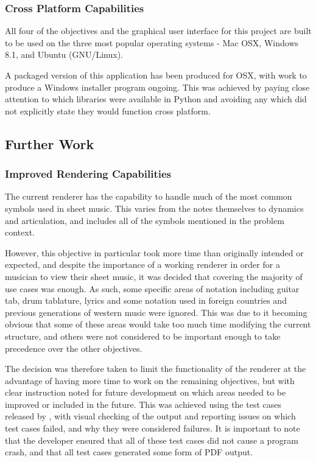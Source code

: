 \subsubsection{Cross Platform Capabilities}
All four of the objectives and the graphical user interface for this project are built to be used on the three most popular operating systems - Mac OSX, Windows 8.1, and Ubuntu (GNU/Linux).

A packaged version of this application has been produced for OSX, with work to produce a Windows installer program ongoing. This was achieved by paying close attention to which libraries were available in Python and avoiding any which did not explicitly state they would function cross platform.


\subsection{Further Work}
\subsubsection{Improved Rendering Capabilities}
The current renderer has the capability to handle much of the most common symbols used in sheet music. This varies from the notes themselves to dynamics and articulation, and includes all of the symbols mentioned in the problem context.

However, this objective in particular took more time than originally intended or expected, and despite the importance of a working renderer in order for a musician to view their sheet music, it was decided that covering the majority of use cases was enough. As such, some specific areas of notation including guitar tab, drum tablature, lyrics and some notation used in foreign countries and previous generations of western music were ignored. This was due to it becoming obvious that some of these areas would take too much time modifying the current structure, and others were not considered to be important enough to take precedence over the other objectives.

The decision was therefore taken to limit the functionality of the renderer at the advantage of having more time to work on the remaining objectives, but with clear instruction noted for future development on which areas needed to be improved or included in the future. This was achieved using the test cases released by \cite{Lilypond}, with visual checking of the output and reporting issues on which test cases failed, and why they were considered failures. It is important to note that the developer ensured that all of these test cases did not cause a program crash, and that all test cases generated some form of PDF output.

